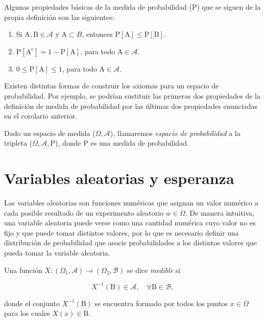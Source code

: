 \begin{corolario}\label{cor:propiedades-adicionales}
    Algunas propiedades básicas de la medida de probabilidad ($\mathrm{P}$) que se siguen de la propia definición son las siguientes:

    \begin{enumerate}
        \item Si $\mathrm{A}, \mathrm{B} \in \mathcal{A}$ y $\mathrm{A} \subset B$, entonces $\mathrm{P}[\mathrm{A}] \le \mathrm{P}[\mathrm{B}]$.
        \item $\mathrm{P}[\mathrm{A^c}] = 1-\mathrm{P}[\mathrm{A}]$, para todo $\mathrm{A} \in \mathcal{A}$.
        \item $0 \le \mathrm{P}[\mathrm{A}] \le 1$, para todo $\mathrm{A} \in \mathcal{A}$.
    \end{enumerate}
\end{corolario}

\begin{observacion}
Existen distintas formas de construir los axiomas para un espacio de probabilidad. Por ejemplo, se podrían sustituir las primeras dos propiedades de la definición de medida de probabilidad por las últimas dos propiedades enunciadas en el corolario anterior.
\end{observacion}

\begin{definicion}\label{def:espacio-de-probabilidad}
    Dado un espacio de medida ($\Omega, \mathcal{A}$), llamaremos \emph{espacio de probabilidad} a la tripleta ($\Omega, \mathcal{A}, \mathrm{P}$), donde $\mathrm{P}$ es una medida de probabilidad.
\end{definicion}

\section{Variables aleatorias y esperanza}

Las variables aleatorias son funciones numéricas que asignan un valor numérico a cada posible resultado de un experimento aleatorio $w \in \Omega$. De manera intuitiva, una variable aleatoria puede verse como una cantidad numérica cuyo valor no es fijo y que puede tomar distintos valores, por lo que es necesario definir una distribución de probabilidad que asocie probabilidades a los distintos valores que pueda tomar la variable aleatoria. 

\begin{definicion}\label{def:funcion-medible}
    Una función $X: (\Omega_1, \mathcal{A}) \to (\Omega_2, \mathcal{B})$ se dice \emph{medible} si

    \[ X^{-1}(\mathrm{B}) \in \mathcal{A}, \quad \forall \mathrm{B}  \in \mathcal{B}, \]

    donde el conjunto $ X^{-1}(\mathrm{B})$ se encuentra formado por todos los puntos $x \in \Omega$ para los cuales $X(x) \in \mathrm{B}$.
\end{definicion}

